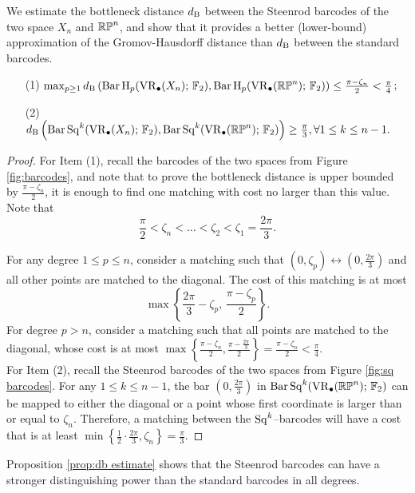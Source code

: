 We estimate the bottleneck distance $d_{\mathrm{B}}$ between the Steenrod barcodes of the two space $X_n$ and $\mathbb{RP}^n$, and show that it provides a better (lower-bound) approximation of the Gromov-Hausdorff distance than $d_{\mathrm{B}}$ between the standard barcodes.  

\begin{proposition}\label{prop:db estimate}
\begin{itemize}
    \item [(1)] $\max_{p\geq 1}d_{\mathrm{B}}\left(\operatorname{Bar} \operatorname{H}_{p}(\operatorname{VR}_\bullet(X_n);\,{\mathbb{F}_2}), \operatorname{Bar} \operatorname{H}_{p}(\operatorname{VR}_\bullet(\mathbb{RP}^n);\,{\mathbb{F}_2})\right)\leq \frac{\pi-\zeta_n}{2}<\frac{\pi}{4}$;
    \item [(2)] $d_{\mathrm{B}}\left(\operatorname{Bar}\operatorname{Sq}^{k}(\operatorname{VR}_\bullet(X_n);\,{\mathbb{F}_2}), \operatorname{Bar}\operatorname{Sq}^{k}(\operatorname{VR}_\bullet(\mathbb{RP}^n);\,{\mathbb{F}_2})\right)\geq \frac{\pi}{3},\forall 1\leq k\leq n-1.$
\end{itemize}
\end{proposition}

\begin{proof}
For Item (1), recall the barcodes of the two spaces from Figure \ref{fig:barcodes}, and note that to prove the bottleneck distance is upper bounded by $\frac{\pi-\zeta_n}{2}$, it is enough to find one matching with cost no larger than this value. Note that
\[\frac{\pi}{2}<\zeta_n<\dots<\zeta_2<\zeta_1 =\frac{2\pi}{3}.\]

For any degree $1\leq p\leq n$, consider a matching such that $(0,\zeta_p)\leftrightarrow \left(0,\frac{2\pi}{3}\right)$ and all other points are matched to the diagonal. The cost of this matching is at most 
\[\max\left\{\frac{2\pi}{3}-\zeta_p,\,\frac{\pi-\zeta_p}{2}\right\}.\]
For degree $p>n$, consider a matching such that all points are matched to the diagonal, whose cost is at most $\max\left\{ \frac{\pi-\zeta_n}{2}, \frac{\pi-\frac{2\pi}{3}}{2}\right\} = \frac{\pi-\zeta_n}{2}<\frac{\pi}{4}.$ 
\\

For Item (2), recall the Steenrod barcodes of the two spaces from Figure \ref{fig:sq barcodes}. For any $1\leq k\leq n-1$, the bar $\left(0,\frac{2\pi}{3}\right)$ in $\operatorname{Bar}\operatorname{Sq}^{k}(\operatorname{VR}_\bullet(\mathbb{RP}^n);\,{\mathbb{F}_2})$ can be mapped to either the diagonal or a point whose first coordinate is larger than or equal to $\zeta_n$. Therefore, a matching between the $\operatorname{Sq}^k$--barcodes will have a cost that is at least $\min\left\{\frac{1}{2}\cdot\frac{2\pi}{3}, \zeta_n\right\} = \frac{\pi}{3}.$
\end{proof}

Proposition \ref{prop:db estimate} shows that the Steenrod barcodes can have a stronger distinguishing power than the standard barcodes in all degrees.
